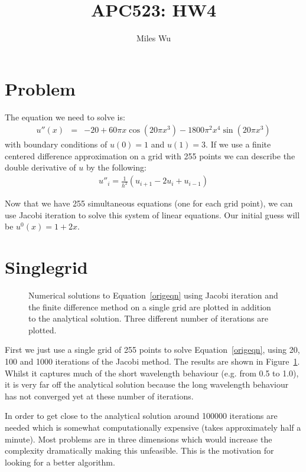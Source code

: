 \documentclass[11pt]{article}
\begin{document}
\title{APC523: HW4}
\author{Miles Wu}
\maketitle

\section{Problem}
The equation we need to solve is:
\begin{eqnarray}
u''(x) &=& -20 + 60 \pi x \cos (20 \pi x^3) - 1800 \pi^2 x^4 \sin (20 \pi x^3)
\label{origeqn}
\end{eqnarray}
with boundary conditions of $u(0) = 1$ and $u(1) = 3$. If we use a finite centered difference approximation on a grid with 255 points we can describe the double derivative of $u$ by the following:
\begin{eqnarray}
u''_i = \frac{1}{h^2} ( u_{i+1} - 2 u_i + u_{i-1} )
\end{eqnarray}

Now that we have 255 simultaneous equations (one for each grid point), we can use Jacobi iteration to solve this system of linear equations. Our initial guess will be $u^0(x) = 1 + 2x$.

\section{Singlegrid}
\begin{figure}
  \centering

  \caption{Numerical solutions to Equation~\ref{origeqn} using Jacobi iteration and the finite difference method on a single grid are plotted in addition to the analytical solution. Three different number of iterations are plotted.}
  \label{singlegrid-plot}
\end{figure}
First we just use a single grid of 255 points to solve Equation~\ref{origeqn}, using 20, 100 and 1000 iterations of the Jacobi method. The results are shown in Figure~\ref{singlegrid-plot}. Whilst it captures much of the short wavelength behaviour (e.g. from 0.5 to 1.0), it is very far off the analytical solution because the long wavelength behaviour has not converged yet at these number of iterations.

In order to get close to the analytical solution around 100000 iterations are needed which is somewhat computationally expensive (takes approximately half a minute). Most problems are in three dimensions which would increase the complexity dramatically making this unfeasible. This is the motivation for looking for a better algorithm.
\end{document}
